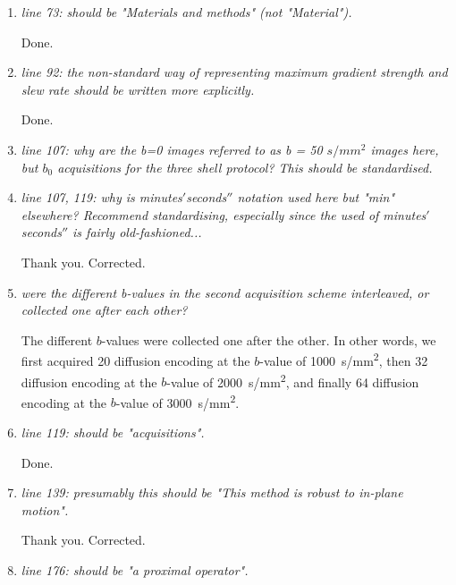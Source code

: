 \documentclass[a4paper,11pt,twoside]{report}
\begin{document}
\begin{enumerate}[resume]
    \item \textit{line 73: should be "Materials and methods" (not "Material").}

    \hspace{1em} Done.

    \item \textit{line 92: the non-standard way of representing maximum gradient strength and slew rate should be written more explicitly.}

    \hspace{1em} Done.

    \item \textit{line 107: why are the b=0 images referred to as b = 50 $s/mm^2$ images here, but $b_0$ acquisitions for the three shell protocol? This should be standardised.}


    \item \textit{line 107, 119: why is minutes$'$seconds$''$ notation used here but "min" elsewhere? Recommend standardising, especially since the used of minutes$'$seconds$''$ is fairly old-fashioned...}

    Thank you. Corrected.

    \item \textit{were the different b-values in the second acquisition scheme interleaved, or collected one after each other?}

    \hspace{1em}
    The different $b$-values were collected one after the other.
    In other words, we first acquired 20 diffusion encoding at the $b$-value of \SI{1000}{s/mm^2},
    then 32 diffusion encoding at the $b$-value of \SI{2000}{s/mm^2},
    and finally 64 diffusion encoding at the $b$-value of \SI{3000}{s/mm^2}.

    \item \textit{line 119: should be "acquisitions".}

    \hspace{1em} Done.

    \item \textit{line 139: presumably this should be "This method is robust to in-plane motion".}

    \hspace{1em} Thank you. Corrected.

    \item \textit{line 176: should be "a proximal operator".}


\end{enumerate}
\end{document}
